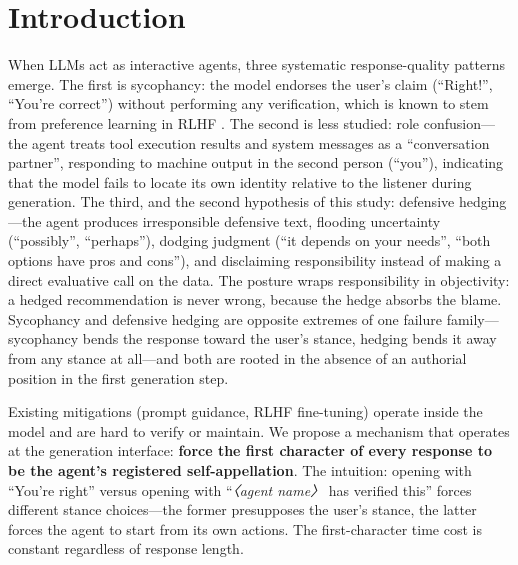 \documentclass[10pt,twocolumn]{article}
\begin{document}
\section{Introduction}
When LLMs act as interactive agents, three systematic response-quality patterns emerge.
The first is sycophancy: the model endorses the user's claim (``Right!'', ``You're
correct'') without performing any verification, which is known to stem from preference
learning in RLHF \cite{sharma2024towards}. The second is less studied: role confusion---
the agent treats tool execution results and system messages as a ``conversation partner'',
responding to machine output in the second person (``you''), indicating that the model
fails to locate its own identity relative to the listener during generation. The third,
and the second hypothesis of this study: defensive hedging---the agent produces
irresponsible defensive text, flooding uncertainty (``possibly'', ``perhaps''), dodging
judgment (``it depends on your needs'', ``both options have pros and cons''), and
disclaiming responsibility instead of making a direct evaluative call on the data. The
posture wraps responsibility in objectivity: a hedged recommendation is never wrong,
because the hedge absorbs the blame. Sycophancy and defensive hedging are opposite
extremes of one failure family---sycophancy bends the response toward the user's stance,
hedging bends it away from any stance at all---and both are rooted in the absence of an
authorial position in the first generation step.

Existing mitigations (prompt guidance, RLHF fine-tuning) operate inside the model and are
hard to verify or maintain. We propose a mechanism that operates at the generation
interface: \textbf{force the first character of every response to be the agent's
registered self-appellation}. The intuition: opening with ``You're right'' versus opening
with ``\textit{〈agent name〉} has verified this'' forces different stance choices---the
former presupposes the user's stance, the latter forces the agent to start from its own
actions. The first-character time cost is constant regardless of response length.
\end{document}
